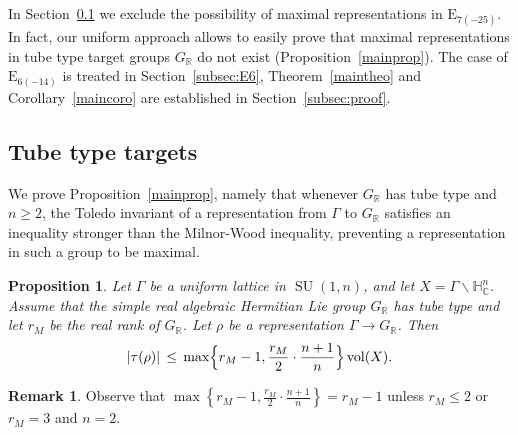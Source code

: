 \documentclass[10pt]{amsart}
\theoremstyle{plain}
\newtheorem{prop}[theo]{Proposition}
\theoremstyle{definition}
\newtheorem{rema}[theo]{Remark}
\DeclareMathOperator{\SU}{SU}
\DeclareMathOperator{\vol}{vol}
\newcommand{\bR}{\mathbb{R}}
\newcommand{\HC}{{\mathbb{H}^n_\mathbb{C}}}
\newcommand{\rkm}{{r_M}}
\begin{document}
In Section~\ref{subsec:tube} we exclude the possibility of maximal representations in $\mathrm{E}_{7(-25)}$.
In fact, our uniform approach allows to easily prove that maximal
representations in tube type target groups $G_\bR$ do not exist (Proposition~\ref{mainprop}). The
case of $\mathrm{E}_{6(-14)}$ is
treated in Section~\ref{subsec:E6}, Theorem~\ref{maintheo} and Corollary~\ref{maincoro} are
established in Section~\ref{subsec:proof}.

\subsection{Tube type targets}\label{subsec:tube}

We prove Proposition~\ref{mainprop}, namely that whenever $G_\bR$ has tube type and $n\geq 2$,
the Toledo invariant of a representation
from $\Gamma$ to
$G_\bR$ satisfies an inequality stronger than the Milnor-Wood inequality, preventing a
representation in such a group to be maximal.

\begin{prop}
\label{prop:tube}
Let $\Gamma$ be a uniform lattice in $\SU(1,n)$, and let $X=\Gamma\backslash\HC$.
Assume that the simple real algebraic Hermitian Lie group $G_\bR$ has tube type and let $\rkm$ be the real rank of $G_\bR$. Let $\rho$ be a
representation $\Gamma\to G_\bR$. Then
$$
|\tau(\rho)|\,\leq\, \max\Bigl\{\rkm-1,\frac \rkm{2}\cdot \frac{n+1}{n}\Bigr\}\vol(X). $$
\end{prop}

\begin{rema}
Observe that $\max\left\{{\rkm-1,\frac \rkm{2}\cdot \frac{n+1}{n}}\right\}=\rkm-1$ unless
$\rkm\leq 2$ or $\rkm=3$ and $n=2$.
\end{rema}
\end{document}
